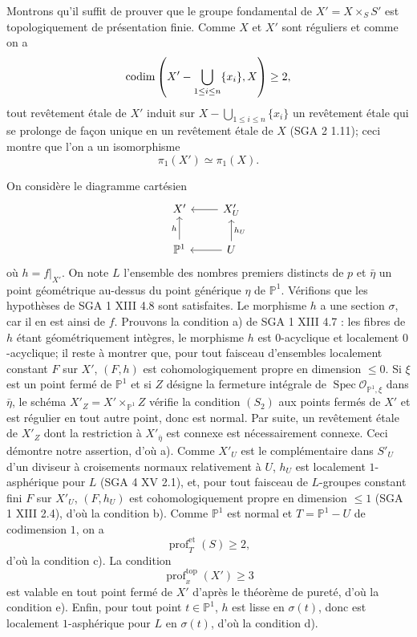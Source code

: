 \documentclass[11pt]{article}
\providecommand{\Spec}{\operatorname{Spec}}
\providecommand{\cO}{\mathcal O}
\providecommand{\et}{\mathrm{et}}
\providecommand{\prof}{\operatorname{prof}}
\begin{document}
Montrons qu'il suffit de prouver que le groupe fondamental de $X'=X\times_S S'$ est topologiquement de présentation finie. Comme $X$ et $X'$ sont réguliers et comme on a
\[
 \operatorname{codim}\left(X'-\bigcup_{1\le i\le n}\{x_i\},X\right)\ge2,
\]
tout revêtement étale de $X'$ induit sur $X-\bigcup_{1\le i\le n}\{x_i\}$ un revêtement étale qui se prolonge de façon unique en un revêtement étale de $X$ (SGA 2 1.11); ceci montre que l'on a un isomorphisme
\[
 \pi_1(X')\simeq \pi_1(X).
\]

On considère le diagramme cartésien
\[
\begin{tikzcd}
X' & X'_U \arrow[l]\\
\mathbb P^1 \arrow[u,"h"] & U \arrow[l] \arrow[u,"h_U"']
\end{tikzcd}
\]
où $h=f|_{X'}$. On note $L$ l'ensemble des nombres premiers distincts de $p$ et $\bar\eta$ un point géométrique au-dessus du point générique $\eta$ de $\mathbb P^1$. Vérifions que les hypothèses de SGA 1 XIII 4.8 sont satisfaites. Le morphisme $h$ a une section $\sigma$, car il en est ainsi de $f$. Prouvons la condition a) de SGA 1 XIII 4.7 : les fibres de $h$ étant géométriquement intègres, le morphisme $h$ est $0$-acyclique et localement $0$-acyclique; il reste à montrer que, pour tout faisceau d'ensembles localement constant $F$ sur $X'$, $(F,h)$ est cohomologiquement propre en dimension $\le0$. Si $\xi$ est un point fermé de $\mathbb P^1$ et si $Z$ désigne la fermeture intégrale de $\Spec \cO_{\mathbb P^1,\xi}$ dans $\bar\eta$, le schéma $X'_Z=X'\times_{\mathbb P^1}Z$ vérifie la condition $(S_2)$ aux points fermés de $X'$ et est régulier en tout autre point, donc est normal. Par suite, un revêtement étale de $X'_Z$ dont la restriction à $X'_{\bar\eta}$ est connexe est nécessairement connexe. Ceci démontre notre assertion, d'où a). Comme $X'_U$ est le complémentaire dans $S'_U$ d'un diviseur à croisements normaux relativement à $U$, $h_U$ est localement $1$-asphérique pour $L$ (SGA 4 XV 2.1), et, pour tout faisceau de $L$-groupes constant fini $F$ sur $X'_U$, $(F,h_U)$ est cohomologiquement propre en dimension $\le1$ (SGA 1 XIII 2.4), d'où la condition b). Comme $\mathbb P^1$ est normal et $T=\mathbb P^1-U$ de codimension $1$, on a
\[
 \prof^{\et}_T(S)\ge2,
\]
d'où la condition c). La condition
\[
 \prof^{\mathrm{top}}_x(X')\ge3
\]
est valable en tout point fermé de $X'$ d'après le théorème de pureté, d'où la condition e). Enfin, pour tout point $t\in\mathbb P^1$, $h$ est lisse en $\sigma(t)$, donc est localement $1$-asphérique pour $L$ en $\sigma(t)$, d'où la condition d).
\end{document}

